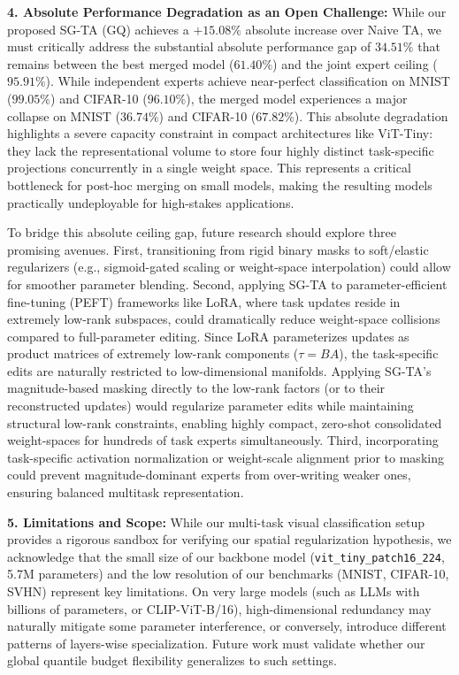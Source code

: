 \textbf{4. Absolute Performance Degradation as an Open Challenge:}
While our proposed SG-TA (GQ) achieves a $+15.08\%$ absolute increase over Naive TA, we must critically address the substantial absolute performance gap of $34.51\%$ that remains between the best merged model ($61.40\%$) and the joint expert ceiling ($95.91\%$). While independent experts achieve near-perfect classification on MNIST ($99.05\%$) and CIFAR-10 ($96.10\%$), the merged model experiences a major collapse on MNIST ($36.74\%$) and CIFAR-10 ($67.82\%$). This absolute degradation highlights a severe capacity constraint in compact architectures like ViT-Tiny: they lack the representational volume to store four highly distinct task-specific projections concurrently in a single weight space. This represents a critical bottleneck for post-hoc merging on small models, making the resulting models practically undeployable for high-stakes applications. 

To bridge this absolute ceiling gap, future research should explore three promising avenues. First, transitioning from rigid binary masks to soft/elastic regularizers (e.g., sigmoid-gated scaling or weight-space interpolation) could allow for smoother parameter blending. Second, applying SG-TA to parameter-efficient fine-tuning (PEFT) frameworks like LoRA, where task updates reside in extremely low-rank subspaces, could dramatically reduce weight-space collisions compared to full-parameter editing. Since LoRA parameterizes updates as product matrices of extremely low-rank components ($\tau = BA$), the task-specific edits are naturally restricted to low-dimensional manifolds. Applying SG-TA's magnitude-based masking directly to the low-rank factors (or to their reconstructed updates) would regularize parameter edits while maintaining structural low-rank constraints, enabling highly compact, zero-shot consolidated weight-spaces for hundreds of task experts simultaneously. Third, incorporating task-specific activation normalization or weight-scale alignment prior to masking could prevent magnitude-dominant experts from over-writing weaker ones, ensuring balanced multitask representation.

\textbf{5. Limitations and Scope:}
While our multi-task visual classification setup provides a rigorous sandbox for verifying our spatial regularization hypothesis, we acknowledge that the small size of our backbone model (\texttt{vit\_tiny\_patch16\_224}, 5.7M parameters) and the low resolution of our benchmarks (MNIST, CIFAR-10, SVHN) represent key limitations. On very large models (such as LLMs with billions of parameters, or CLIP-ViT-B/16), high-dimensional redundancy may naturally mitigate some parameter interference, or conversely, introduce different patterns of layers-wise specialization. Future work must validate whether our global quantile budget flexibility generalizes to such settings.

